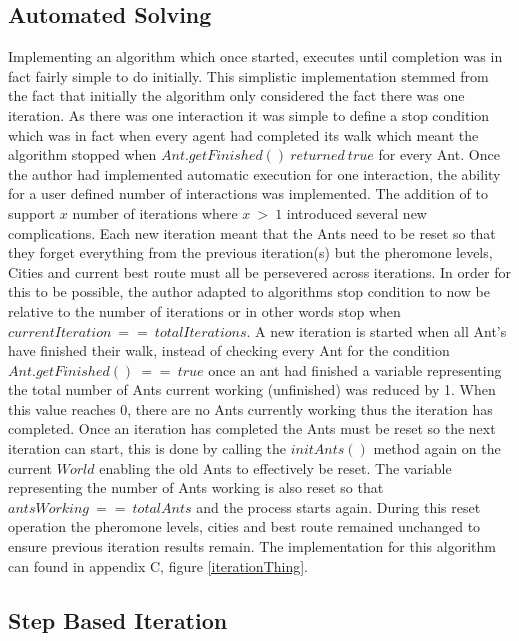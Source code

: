 \subsection{Automated Solving}
\label{autoSolve}
Implementing an algorithm which once started, executes until completion was in fact fairly simple to do initially. This simplistic implementation stemmed from the fact that initially the algorithm only considered the fact there was one iteration. As there was one interaction it was simple to define a stop condition which was in fact when every agent had completed its walk which meant the algorithm stopped when $Ant.getFinished()\ returned\ true$ for every Ant. Once the author had implemented automatic execution for one interaction, the ability for a user defined number of interactions was implemented. The addition of to support $x$ number of iterations where $x\ >\ 1$ introduced several new complications. Each new iteration meant that the Ants need to be reset so that they forget everything from the previous iteration(s) but the pheromone levels, Cities and current best route must all be persevered across iterations. In order for this to be possible, the author adapted to algorithms stop condition to now be relative to the number of iterations or in other words stop when $currentIteration\ ==\ totalIterations$. A new iteration is started when all Ant's have finished their walk, instead of checking every Ant for the condition $Ant.getFinished()\ ==\ true$ once an ant had finished a variable representing the total number of Ants current working (unfinished) was reduced by 1. When this value reaches 0, there are no Ants currently working thus the iteration has completed. Once an iteration has completed the Ants must be reset so the next iteration can start, this is done by calling the $initAnts()$ method again on the current $World$ enabling the old Ants to effectively be reset. The variable representing the number of Ants working is also reset so that $antsWorking\ ==\ totalAnts$ and the process starts again. During this reset operation the pheromone levels, cities and best route remained unchanged to ensure previous iteration results remain. The implementation for this algorithm can found in appendix C, figure \ref{iterationThing}.

\subsection{Step Based Iteration}

